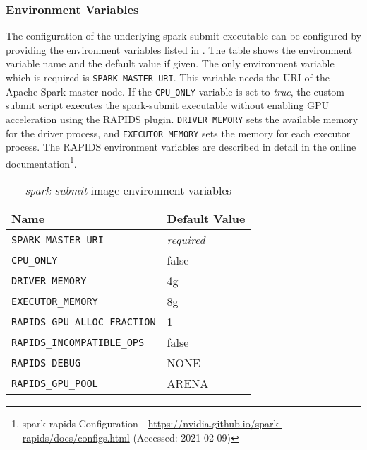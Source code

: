 \subsubsection{Environment Variables}
The configuration of the underlying spark-submit executable can be configured by providing the environment variables listed in . The table shows the environment variable name and the default value if given.
The only environment variable which is required is \texttt{SPARK\_MASTER\_URI}. This variable needs the URI of the Apache Spark master node.
If the \texttt{CPU\_ONLY} variable is set to \textit{true}, the custom submit script executes the spark-submit executable without enabling GPU acceleration using the RAPIDS plugin.
\texttt{DRIVER\_MEMORY} sets the available memory for the driver process, and \texttt{EXECUTOR\_MEMORY} sets the memory for each executor process.
The RAPIDS environment variables are described in detail in the online documentation\footnote{spark-rapids Configuration - \url{https://nvidia.github.io/spark-rapids/docs/configs.html} (Accessed: 2021-02-09)}.
\begin{table}[]
\centering
\begin{tabular}{@{}ll@{}}
\toprule
Name                                                   & Default Value     \\ \midrule
\texttt{SPARK\_MASTER\_URI}           & \textit{required} \\
\texttt{CPU\_ONLY}           & false \\
\texttt{DRIVER\_MEMORY}               & 4g                \\
\texttt{EXECUTOR\_MEMORY}             & 8g                \\
\texttt{RAPIDS\_GPU\_ALLOC\_FRACTION} & 1                 \\
\texttt{RAPIDS\_INCOMPATIBLE\_OPS}    & false             \\
\texttt{RAPIDS\_DEBUG}                & NONE              \\
\texttt{RAPIDS\_GPU\_POOL}            & ARENA             \\ \bottomrule
\end{tabular}
\caption{\textit{spark-submit} image environment variables}
\label{table:06_env_depl_submit-envs}
\end{table}


